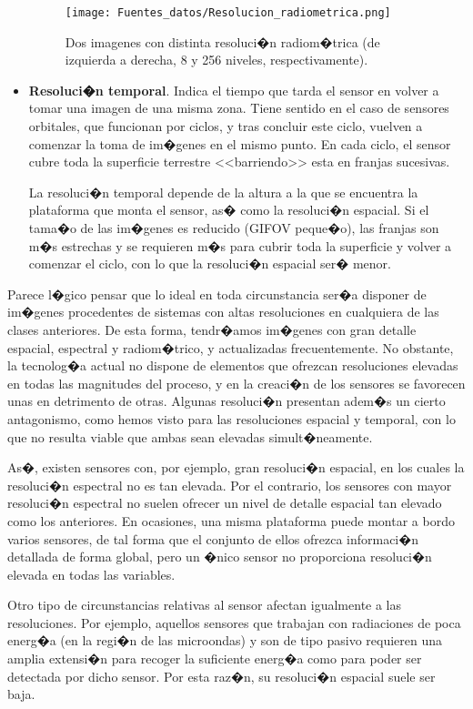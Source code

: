 \begin{itemize}
\begin{figure}[!hbt]   
\centering
\texttt{[image: Fuentes\_datos/Resolucion\_radiometrica.png]}
\caption{\small Dos imagenes con distinta resoluci�n radiom�trica (de izquierda a derecha, 8 y 256 niveles, respectivamente).}
\label{Fig:Resolucion_radiometrica} 
\end{figure}

	\item \textbf{Resoluci�n temporal}. Indica el tiempo que tarda el sensor en volver a tomar una imagen de una misma zona.  Tiene sentido en el caso de sensores orbitales, que funcionan por ciclos, y tras concluir este ciclo,  vuelven a comenzar la toma de im�genes en el mismo punto. En cada ciclo, el sensor cubre toda la superficie terrestre <<barriendo>> esta en franjas sucesivas.
	
	La resoluci�n temporal depende de la altura a la que se encuentra la plataforma que monta el sensor, as� como la resoluci�n espacial. Si el tama�o de las im�genes es reducido (GIFOV peque�o), las franjas son m�s estrechas y se requieren m�s para cubrir toda la superficie y volver a comenzar el ciclo, con lo que la resoluci�n espacial ser� menor.
\end{itemize}

Parece l�gico pensar que lo ideal en toda circunstancia ser�a disponer de im�genes procedentes de sistemas con altas resoluciones en cualquiera de las clases anteriores. De esta forma, tendr�amos im�genes con gran detalle espacial, espectral y radiom�trico, y actualizadas frecuentemente. No obstante, la tecnolog�a actual no dispone de elementos que ofrezcan resoluciones elevadas en todas las magnitudes del proceso, y en la creaci�n de los sensores se favorecen unas en detrimento de otras. Algunas resoluci�n presentan adem�s un cierto antagonismo, como hemos visto para las resoluciones espacial y temporal, con lo que no resulta viable que ambas sean elevadas simult�neamente.

As�, existen sensores con, por ejemplo, gran resoluci�n espacial, en los cuales la resoluci�n espectral no es tan elevada. Por el contrario, los sensores con mayor resoluci�n espectral no suelen ofrecer un nivel de detalle espacial tan elevado como los anteriores. En ocasiones, una misma plataforma puede montar a bordo varios sensores, de tal forma que el conjunto de ellos ofrezca informaci�n detallada de forma global, pero un �nico sensor no proporciona resoluci�n elevada en todas las variables.

Otro tipo de circunstancias relativas al sensor afectan igualmente a las resoluciones. Por ejemplo, aquellos sensores que trabajan con radiaciones de poca energ�a (en la regi�n de las microondas) y son de tipo pasivo requieren una amplia extensi�n para recoger la suficiente energ�a como para poder ser detectada por dicho sensor. Por esta raz�n, su resoluci�n espacial suele ser baja. 

